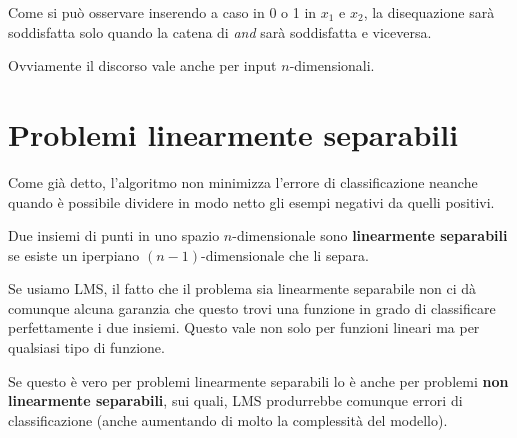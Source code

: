 Come si pu\`o osservare inserendo a caso in 0 o 1 in $x_1$ e $x_2$, la disequazione sar\`a soddisfatta solo quando la
catena di \emph{and} sar\`a soddisfatta e viceversa.

Ovviamente il discorso vale anche per input $n$-dimensionali.

\section{Problemi linearmente separabili}
Come gi\`a detto, l'algoritmo non minimizza l'errore di classificazione neanche quando \`e possibile dividere in modo
netto gli esempi negativi da quelli positivi.
\begin{definition}
	Due insiemi di punti in uno spazio $n$-dimensionale sono \textbf{linearmente separabili} se esiste un
	iperpiano $(n-1)$-dimensionale che li separa.
\end{definition}

Se usiamo LMS, il fatto che il problema sia linearmente separabile non ci d\`a comunque alcuna garanzia che questo trovi
una funzione in grado di classificare perfettamente i due insiemi. Questo vale non solo per funzioni lineari ma per
qualsiasi tipo di funzione.

Se questo \`e vero per problemi linearmente separabili lo \`e anche per problemi \textbf{non linearmente separabili}, sui
quali, LMS produrrebbe comunque errori di classificazione (anche aumentando di molto la complessit\`a del modello).